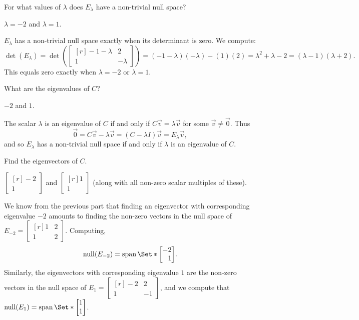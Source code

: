 \documentclass{problemset}
\DeclareMathOperator{\Span}{span}
\DeclareMathOperator{\Null}{null}
\newcommand{\mat}[1]{\begin{bmatrix*}[r]#1\end{bmatrix*}}
\begin{document}
	\begin{parts}
		\item For what values of $\lambda$ does $E_\lambda$ have a non-trivial
			null space?
			\begin{solution}
				$\lambda=-2$ and $\lambda=1$. 

				$E_\lambda$ has a non-trivial null space exactly when its 
				determinant is zero. We compute:
				\[
					\det(E_\lambda)
					=\det\left(\mat{-1-\lambda&2\\1&-\lambda}\right)
					=(-1-\lambda)(-\lambda)-(1)(2)
					=\lambda^2+\lambda-2
					=(\lambda-1)(\lambda+2).
				\]
				This equals zero exactly when $\lambda=-2$ or $\lambda=1$.
			\end{solution}
		\item What are the eigenvalues of $C$?
			\begin{solution}
				$-2$ and $1$.

				The scalar $\lambda$ is an eigenvalue of $C$ if and only if $C\vec v=\lambda \vec v$ for
				some $\vec v\neq \vec 0$. Thus
				\[
					\vec 0=C\vec v-\lambda \vec v=(C-\lambda I)\vec v=E_\lambda \vec v,
				\]
				and so $E_{\lambda}$ has a non-trivial null space if and only if $\lambda$ is
				an eigenvalue of $C$.
			\end{solution}
		\item Find the eigenvectors of $C$.
			\begin{solution}
				$\mat{-2\\1}$ and $\mat{1\\1}$ (along with all non-zero scalar
				multiples of these).

				We know from the previous part that finding an eigenvector with
				corresponding eigenvalue $-2$ amounts to finding the non-zero 
				vectors	in the null space of  
				$E_{-2}=\mat{1&2\\1&2}$. Computing,
				\[\Null(E_{-2})=\Span\Set*{\mat{-2\\1}}.\]
				Similarly, the eigenvectors with corresponding eigenvalue $1$ are
				the non-zero vectors in the null space of $E_1=\mat{-2&2\\1&-1}$, 
				and we compute that $\Null(E_1)=\Span\Set*{\mat{1\\1}}$.
			\end{solution}
	\end{parts}
\end{document}
